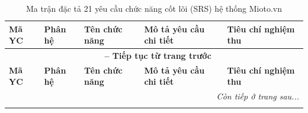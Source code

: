 {\small
\begin{longtable}{p{2.3cm}p{2.2cm}p{2.8cm}p{4.2cm}p{3.8cm}}
\caption{Ma trận đặc tả 21 yêu cầu chức năng cốt lõi (SRS) hệ thống Mioto.vn} \label{tab:srs_full_table} \\
\toprule
\textbf{Mã YC} & \textbf{Phân hệ} & \textbf{Tên chức năng} & \textbf{Mô tả yêu cầu chi tiết} & \textbf{Tiêu chí nghiệm thu} \\
\midrule
\endfirsthead

\multicolumn{5}{c}{{\bfseries \tablename\ \thetable{} -- Tiếp tục từ trang trước}} \\
\toprule
\textbf{Mã YC} & \textbf{Phân hệ} & \textbf{Tên chức năng} & \textbf{Mô tả yêu cầu chi tiết} & \textbf{Tiêu chí nghiệm thu} \\
\midrule
\endhead

\midrule \multicolumn{5}{r}{{\slshape Còn tiếp ở trang sau...}} \\
\endfoot

\bottomrule
\endlastfoot


\end{longtable}}
